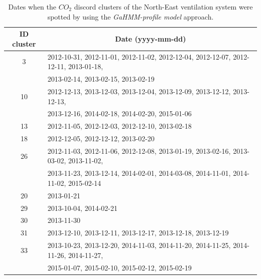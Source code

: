 \begin{table}[htbp]
  \centering
  \scriptsize
  \caption{Dates when the $CO_2$ discord clusters of the North-East ventilation system were spotted by using the \textit{GaHMM-profile model} approach.}
    \begin{tabular}{|c|l|}
    \hline
    \rowcolor[rgb]{ .851,  .851,  .851} \textbf{ID cluster} & \multicolumn{1}{c|}{\textbf{Date (yyyy-mm-dd)}} \bigstrut\\
    \hline
    3    & 2012-10-31, 2012-11-01, 2012-11-02, 2012-12-04, 2012-12-07, 2012-12-11, 2013-01-18, \bigstrut[t]\\
         & 2013-02-14, 2013-02-15, 2013-02-19 \bigstrut[b]\\
    \hline
    \rowcolor[rgb]{ .949,  .949,  .949} 10   & 2012-12-13, 2013-12-03, 2013-12-04, 2013-12-09, 2013-12-12, 2013-12-13, \bigstrut[t]\\
    \rowcolor[rgb]{ .949,  .949,  .949}      & 2013-12-16, 2014-02-18, 2014-02-20, 2015-01-06 \bigstrut[b]\\
    \hline
    13   & 2012-11-05, 2012-12-03, 2012-12-10, 2013-02-18 \bigstrut\\
    \hline
    18   & 2012-12-05, 2012-12-12, 2013-02-20 \bigstrut\\
    \hline
    \rowcolor[rgb]{ .949,  .949,  .949} 26   & 2012-11-03, 2012-11-06, 2012-12-08, 2013-01-19, 2013-02-16, 2013-03-02, 2013-11-02,  \bigstrut[t]\\
    \rowcolor[rgb]{ .949,  .949,  .949}      & 2013-11-23, 2013-12-14, 2014-02-01, 2014-03-08, 2014-11-01, 2014-11-02, 2015-02-14 \bigstrut[b]\\
    \hline
    20   & 2013-01-21 \bigstrut\\
    \hline
    29   & 2013-10-04, 2014-02-21 \bigstrut\\
    \hline
    \rowcolor[rgb]{ .949,  .949,  .949} 30   & 2013-11-30 \bigstrut\\
    \hline
    31   & 2013-12-10, 2013-12-11, 2013-12-17, 2013-12-18, 2013-12-19 \bigstrut\\
    \hline
    33   & 2013-10-23, 2013-12-20, 2014-11-03, 2014-11-20, 2014-11-25, 2014-11-26, 2014-11-27, \bigstrut[t]\\
         &  2015-01-07, 2015-02-10, 2015-02-12, 2015-02-19 \bigstrut[b]\\
    \hline
    \end{tabular}%
  \label{tab:dates_NE_CO2_ventilation}%
\end{table}%


